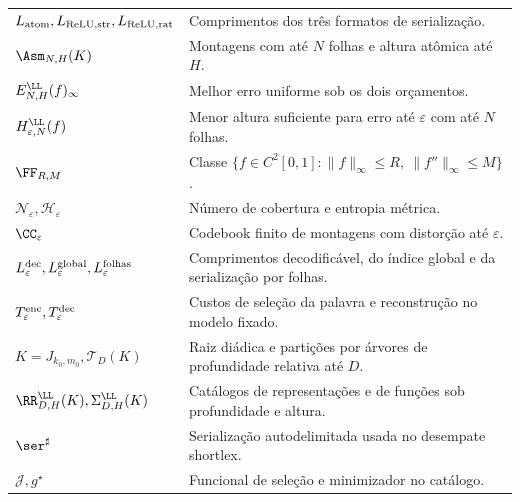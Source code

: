 \begin{longtable}{@{}p{.28\linewidth}p{.68\linewidth}@{}}
$L_{\rm atom},L_{\rm ReLU,str},L_{\rm ReLU,rat}$&Comprimentos dos três formatos de serialização.\\
$\Asm_{N,H}(K)$&Montagens com até $N$ folhas e altura atômica até $H$.\\
$E^{\LL}_{N,H}(f)_\infty$&Melhor erro uniforme sob os dois orçamentos.\\
$H^{\LL}_{\varepsilon,N}(f)$&Menor altura suficiente para erro até $\varepsilon$ com até $N$ folhas.\\
$\FF_{R,M}$&Classe $\{f\in C^2[0,1]:\|f\|_\infty\le R,\ \|f''\|_\infty\le M\}$.\\
$\mathcal N_\varepsilon,\mathcal H_\varepsilon$&Número de cobertura e entropia métrica.\\
$\CC_\varepsilon$&Codebook finito de montagens com distorção até $\varepsilon$.\\
$L_\varepsilon^{\rm dec},L_\varepsilon^{\rm global},L_\varepsilon^{\rm folhas}$&Comprimentos decodificável, do índice global e da serialização por folhas.\\
$T_\varepsilon^{\rm enc},T_\varepsilon^{\rm dec}$&Custos de seleção da palavra e reconstrução no modelo fixado.\\
$K=J_{k_0,m_0},\mathcal T_D(K)$&Raiz diádica e partições por árvores de profundidade relativa até $D$.\\
$\RR^{\LL}_{D,H}(K),\Sigma^{\LL}_{D,H}(K)$&Catálogos de representações e de funções sob profundidade e altura.\\
$\ser^\sharp$&Serialização autodelimitada usada no desempate shortlex.\\
$\mathcal J,g^\star$&Funcional de seleção e minimizador no catálogo.\\
\end{longtable}
\normalsize
